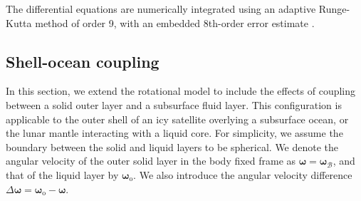 \documentclass[pdflatex,sn-mathphys-num]{sn-jnl}%
\theoremstyle{thmstyleone}%
\theoremstyle{thmstyletwo}%
\theoremstyle{thmstylethree}%
\renewcommand{\vec}[1]{\boldsymbol{#1}}
\begin{document}
%

The differential equations are numerically integrated using an adaptive Runge-Kutta method of order 9, with an embedded 8th-order error estimate \citep{Verner2010}. %




\subsection{Shell-ocean coupling}\label{sec:ocean_rayleigh_V2}


In this section, we extend the rotational model to include the effects of coupling between a solid outer layer and a subsurface fluid layer. This configuration is applicable to the outer shell of an icy satellite overlying a subsurface ocean, or the lunar mantle interacting with a liquid core.
For simplicity, we assume the boundary between the solid and liquid layers to be spherical.
%
We denote the angular velocity of the outer solid layer in the body fixed frame as ${\vec{\omega} = \vec{\omega}_\mathcal{B}}$, and that of the liquid layer by $\vec{\omega}_{\mathrm{o}}$. We also introduce the angular velocity difference ${\Delta \vec{\omega} = \vec{\omega}_{\mathrm{o}} -  \vec{\omega}}$.
%
\end{document}
